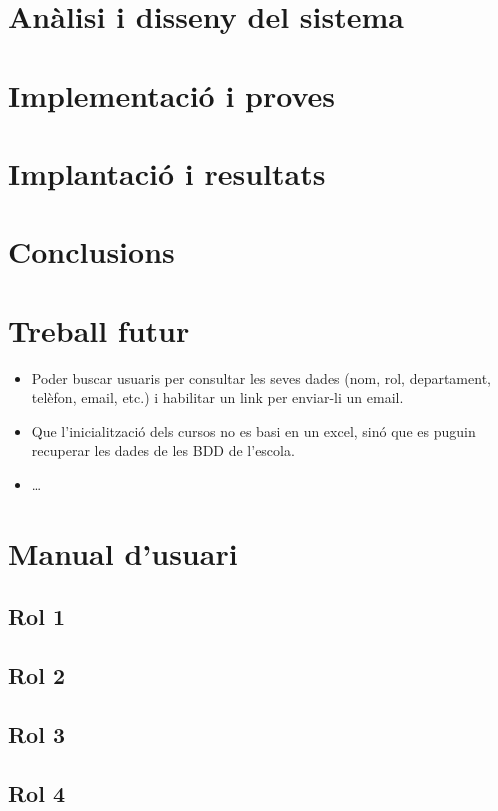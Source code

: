 \documentclass[a4paper,12pt]{ThesisStyle}
\begin{document}
\chapter{Anàlisi i disseny del sistema}
\label{cap:analisi}



\chapter{Implementació i proves}
\label{cap:implementacio}



\chapter{Implantació i resultats}
\label{cap:implantacio}



\chapter{Conclusions}
\label{cap:conclusions}



\chapter{Treball futur}
\label{cap:treball_futur}

\begin{itemize}
  \item Poder buscar usuaris per consultar les seves dades (nom, rol, departament, telèfon, email, etc.) i habilitar un link per enviar-li un email.
  \item Que l'inicialització dels cursos no es basi en un excel, sinó que es puguin recuperar les dades de les BDD de l'escola.
  \item \ldots
\end{itemize}


\backmatter





%

\chapter*{Manual d'usuari}

\section*{Rol 1}



\section*{Rol 2}



\section*{Rol 3}



\section*{Rol 4}
\end{document}
